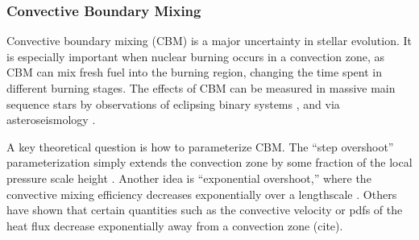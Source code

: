 {\color{purple}
\subsubsection{Convective Boundary Mixing}
}

Convective boundary mixing (CBM) is a major uncertainty in stellar evolution. It is especially important when nuclear burning occurs in a convection zone, as CBM can mix fresh fuel into the burning region, changing the time spent in different burning stages. The effects of CBM can be measured in massive main sequence stars by observations of eclipsing binary systems \cite[e.g.,][]{Stancliffe_2015,Valle_2016}, and via asteroseismology \citep[e.g.,][]{Ghasemi_2016}.

A key theoretical question is how to parameterize CBM. The ``step overshoot'' parameterization simply extends the convection zone by some fraction of the local pressure scale height \cite[e.g.,][]{Shaviv_1973}. Another idea is ``exponential overshoot,'' where the convective mixing efficiency decreases exponentially over a lengthscale \cite{Freytag1996}. Others have shown that certain quantities such as the convective velocity or pdfs of the heat flux decrease exponentially away from a convection zone (cite).